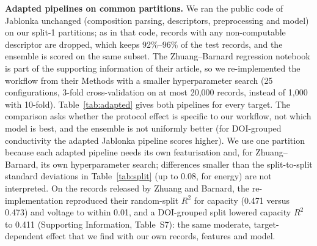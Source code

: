 \documentclass[journal=jcisd8,manuscript=article,layout=traditional]{achemso}
\begin{document}
\textbf{Adapted pipelines on common partitions.} We ran the public code of Jablonka unchanged (composition parsing, descriptors, preprocessing and model) on our split-1 partitions; as in that code, records with any non-computable descriptor are dropped, which keeps 92\%--96\% of the test records, and the ensemble is scored on the same subset. The Zhuang--Barnard regression notebook is part of the supporting information of their article, so we re-implemented the workflow from their Methods with a smaller hyperparameter search (25 configurations, 3-fold cross-validation on at most 20,000 records, instead of 1,000 with 10-fold). Table~\ref{tab:adapted} gives both pipelines for every target. The comparison asks whether the protocol effect is specific to our workflow, not which model is best, and the ensemble is not uniformly better (for DOI-grouped conductivity the adapted Jablonka pipeline scores higher). We use one partition because each adapted pipeline needs its own featurisation and, for Zhuang--Barnard, its own hyperparameter search; differences smaller than the split-to-split standard deviations in Table~\ref{tab:split} (up to 0.08, for energy) are not interpreted. On the records released by Zhuang and Barnard, the re-implementation reproduced their random-split $R^2$ for capacity (0.471 versus 0.473) and voltage to within 0.01, and a DOI-grouped split lowered capacity $R^2$ to 0.411 (Supporting Information, Table~S7): the same moderate, target-dependent effect that we find with our own records, features and model.
\end{document}

